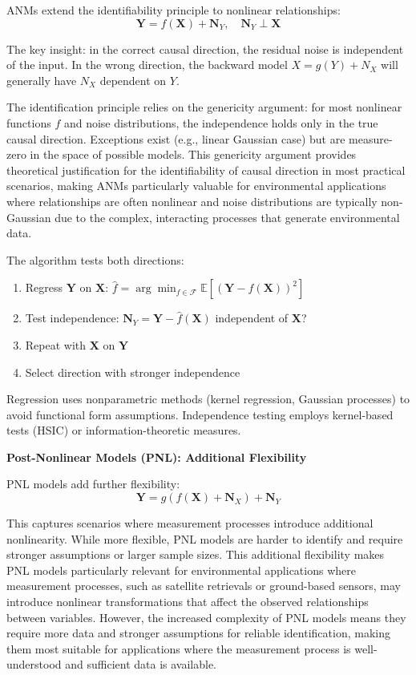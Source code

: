 ANMs extend the identifiability principle to nonlinear relationships:
\begin{equation}
	\mathbf{Y} = f(\mathbf{X}) + \mathbf{N}_Y, \quad \mathbf{N}_Y \perp \mathbf{X}
\end{equation}

The key insight: in the correct causal direction, the residual noise is independent of the input. In the wrong direction, the backward model $X = g(Y) + N_X$ will generally have $N_X$ dependent on $Y$.

The identification principle relies on the genericity argument: for most nonlinear functions $f$ and noise distributions, the independence holds only in the true causal direction. Exceptions exist (e.g., linear Gaussian case) but are measure-zero in the space of possible models. This genericity argument provides theoretical justification for the identifiability of causal direction in most practical scenarios, making ANMs particularly valuable for environmental applications where relationships are often nonlinear and noise distributions are typically non-Gaussian due to the complex, interacting processes that generate environmental data.

The algorithm tests both directions:
\begin{enumerate}
	\item Regress $\mathbf{Y}$ on $\mathbf{X}$: $\hat{f} = \arg\min_{f \in \mathcal{F}} \mathbb{E}[(\mathbf{Y} - f(\mathbf{X}))^2]$
	\item Test independence: $\mathbf{N}_Y = \mathbf{Y} - \hat{f}(\mathbf{X})$ independent of $\mathbf{X}$?
	\item Repeat with $\mathbf{X}$ on $\mathbf{Y}$
	\item Select direction with stronger independence
\end{enumerate}

Regression uses nonparametric methods (kernel regression, Gaussian processes) to avoid functional form assumptions. Independence testing employs kernel-based tests (HSIC) or information-theoretic measures.

\textbf{Post-Nonlinear Models (PNL): Additional Flexibility}

PNL models add further flexibility:
\begin{equation}
	\mathbf{Y} = g(f(\mathbf{X}) + \mathbf{N}_X) + \mathbf{N}_Y
\end{equation}

This captures scenarios where measurement processes introduce additional nonlinearity. While more flexible, PNL models are harder to identify and require stronger assumptions or larger sample sizes. This additional flexibility makes PNL models particularly relevant for environmental applications where measurement processes, such as satellite retrievals or ground-based sensors, may introduce nonlinear transformations that affect the observed relationships between variables. However, the increased complexity of PNL models means they require more data and stronger assumptions for reliable identification, making them most suitable for applications where the measurement process is well-understood and sufficient data is available.

